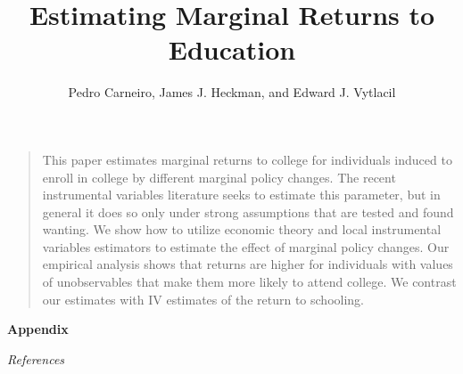 

\title{Estimating Marginal Returns to Education}
\author{Pedro Carneiro, James J. Heckman, and Edward J. Vytlacil}

\date{}

\let\otp\titlepage


\maketitle

 \begin{frame}
\begin{quote} This paper estimates marginal returns to college for individuals induced to enroll in college by different marginal policy changes. The recent instrumental variables literature seeks to estimate this parameter, but in general it does so only under strong assumptions that are tested and found wanting. We show how to utilize economic theory and local instrumental variables estimators to estimate the effect of marginal policy changes. Our empirical analysis shows that returns are higher for individuals with values of unobservables that make them more likely to attend college. We contrast our estimates with IV estimates of the return to schooling.
\end{quote}
 \end{frame}


\beginbackup\appendix
\begin{frame}\begin{center}
\LARGE\textbf{Appendix}
\end{center}\end{frame}

\begin{frame}\begin{center}
\LARGE\textit{References}
\end{center}\end{frame}
\begin{frame}[allowframebreaks]\frametitle{}

\nocite{Carneiro.2011}





\end{frame}

\backupend

